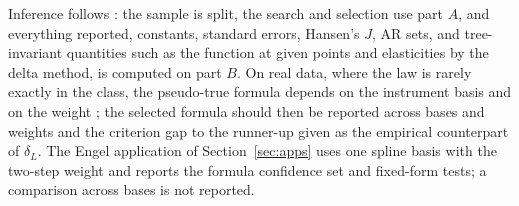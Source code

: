 Inference follows : the sample is split, the search and selection use part $A$, and everything reported, constants, standard errors, Hansen's $J$, AR sets, and tree-invariant quantities such as the function at given points and elasticities by the delta method, is computed on part $B$. On real data, where the law is rarely exactly in the class, the pseudo-true formula depends on the instrument basis and on the weight \citep{hallinoue2003}; the selected formula should then be reported across bases and weights and the criterion gap to the runner-up given as the empirical counterpart of $\delta_L$. The Engel application of Section~\ref{sec:apps} uses one spline basis with the two-step weight and reports the formula confidence set and fixed-form tests; a comparison across bases is not reported.
